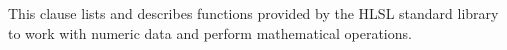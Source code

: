 
\p This clause lists and describes functions provided by the HLSL standard
library to work with numeric data and perform mathematical operations.


